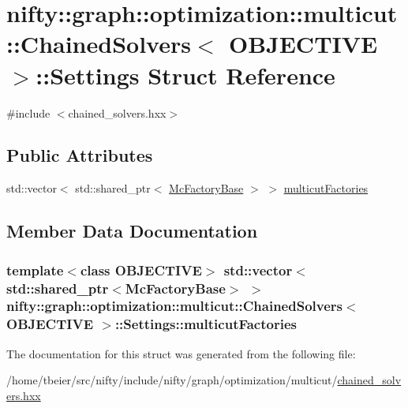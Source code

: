\hypertarget{structnifty_1_1graph_1_1optimization_1_1multicut_1_1ChainedSolvers_1_1Settings}{}\section{nifty\+:\+:graph\+:\+:optimization\+:\+:multicut\+:\+:Chained\+Solvers$<$ O\+B\+J\+E\+C\+T\+I\+V\+E $>$\+:\+:Settings Struct Reference}
\label{structnifty_1_1graph_1_1optimization_1_1multicut_1_1ChainedSolvers_1_1Settings}


{\ttfamily \#include $<$chained\+\_\+solvers.\+hxx$>$}

\subsection*{Public Attributes}
\begin{DoxyCompactItemize}
\item 
std\+::vector$<$ std\+::shared\+\_\+ptr$<$ \hyperlink{classnifty_1_1graph_1_1optimization_1_1multicut_1_1ChainedSolvers_aeb64bbe409dce15f0961c4697697126a}{Mc\+Factory\+Base} $>$ $>$ \hyperlink{structnifty_1_1graph_1_1optimization_1_1multicut_1_1ChainedSolvers_1_1Settings_a1a1b5e7f8447b59f63223ca3cd68bc25}{multicut\+Factories}
\end{DoxyCompactItemize}


\subsection{Member Data Documentation}
\hypertarget{structnifty_1_1graph_1_1optimization_1_1multicut_1_1ChainedSolvers_1_1Settings_a1a1b5e7f8447b59f63223ca3cd68bc25}{}
\subsubsection[{multicut\+Factories}]{\setlength{\rightskip}{0pt plus 5cm}template$<$class O\+B\+J\+E\+C\+T\+I\+V\+E$>$ std\+::vector$<$ std\+::shared\+\_\+ptr$<${\bf Mc\+Factory\+Base}$>$ $>$ {\bf nifty\+::graph\+::optimization\+::multicut\+::\+Chained\+Solvers}$<$ O\+B\+J\+E\+C\+T\+I\+V\+E $>$\+::Settings\+::multicut\+Factories}\label{structnifty_1_1graph_1_1optimization_1_1multicut_1_1ChainedSolvers_1_1Settings_a1a1b5e7f8447b59f63223ca3cd68bc25}


The documentation for this struct was generated from the following file\+:\begin{DoxyCompactItemize}
\item 
/home/tbeier/src/nifty/include/nifty/graph/optimization/multicut/\hyperlink{chained__solvers_8hxx}{chained\+\_\+solvers.\+hxx}\end{DoxyCompactItemize}
